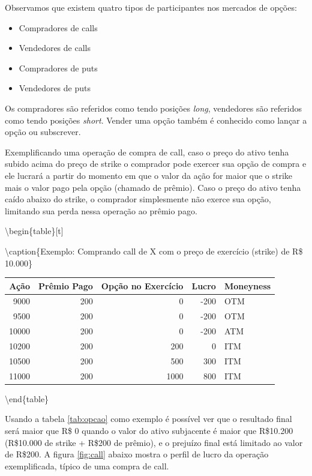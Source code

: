 \documentclass[]{book}
\providecommand{\tightlist}{%
  \setlength{\itemsep}{0pt}\setlength{\parskip}{0pt}}
\begin{document}
Observamos que existem quatro tipos de participantes nos mercados de
opções:

\begin{itemize}
\tightlist
\item
  Compradores de calls
\item
  Vendedores de calls
\item
  Compradores de puts
\item
  Vendedores de puts
\end{itemize}

Os compradores são referidos como tendo posições \emph{long}, vendedores
são referidos como tendo posições \emph{short}. Vender uma opção também
é conhecido como lançar a opção ou subscrever.

Exemplificando uma operação de compra de call, caso o preço do ativo
tenha subido acima do preço de strike o comprador pode exercer sua opção
de compra e ele lucrará a partir do momento em que o valor da ação for
maior que o strike mais o valor pago pela opção (chamado de prêmio).
Caso o preço do ativo tenha caído abaixo do strike, o comprador
simplesmente não exerce sua opção, limitando sua perda nessa operação ao
prêmio pago.

\textbackslash{}begin\{table\}{[}t{]}

\textbackslash{}caption\{\label{tab:opcao}Exemplo: Comprando call de X com o
preço de exercício (strike) de R\$ 10.000\} \centering

\begin{tabular}{r|r|r|r|l}
\hline
Ação & Prêmio Pago & Opção no Exercício & Lucro & Moneyness\\
\hline
9000 & 200 & 0 & -200 & OTM\\
\hline
9500 & 200 & 0 & -200 & OTM\\
\hline
10000 & 200 & 0 & -200 & ATM\\
\hline
10200 & 200 & 200 & 0 & ITM\\
\hline
10500 & 200 & 500 & 300 & ITM\\
\hline
11000 & 200 & 1000 & 800 & ITM\\
\hline
\end{tabular}

\textbackslash{}end\{table\}

Usando a tabela \ref{tab:opcao} como exemplo é possível ver que o
resultado final será maior que R\$ 0 quando o valor do ativo subjacente
é maior que R\$10.200 (R\$10.000 de strike + R\$200 de prêmio), e o
prejuízo final está limitado ao valor de R\$200. A figura \ref{fig:call}
abaixo mostra o perfil de lucro da operação exemplificada, típico de uma
compra de call.
\end{document}
